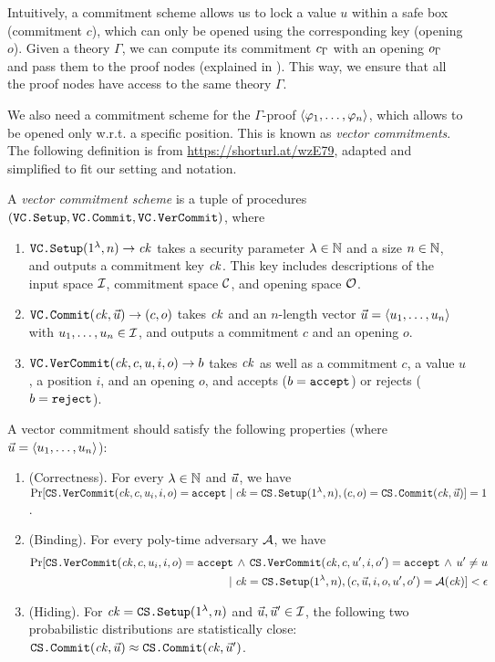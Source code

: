 \documentclass{article}
\begin{document}
Intuitively, a commitment scheme allows us to lock a value $u$
within a safe box (commitment $c$),
which can only be opened using the corresponding key (opening $o$).
Given a theory $\Gamma$, we can compute its commitment $c_\Gamma$
with an opening $o_\Gamma$ and pass them to the proof nodes
(explained in ).
This way, we ensure that all the proof nodes have access to the same
theory $\Gamma$.

We also need a commitment scheme for the $\Gamma$-proof $\left\langle \varphi_1,\dots,\varphi_n \right\rangle$,
which allows to be opened only w.r.t. a specific position.
This is known as \emph{vector commitments}.
The following definition is from \url{https://shorturl.at/wzE79},
adapted and simplified
to fit our setting and notation.
\begin{definition}
A \emph{vector commitment scheme} is a tuple of procedures
$(\textnormal{\texttt{VC.Setup}}, \textnormal{\texttt{VC.Commit}}, \textnormal{\texttt{VC.VerCommit}})$, where
\begin{enumerate}
\item $\textnormal{\texttt{VC.Setup}}(1^\lambda, n) \to \mathit{ck}$
      takes a security parameter $\lambda \in \mathbb{N}$
      and a size $n \in \mathbb{N}$,
      and outputs a commitment key $\mathit{ck}$. This key includes descriptions of
      the input space
      $\mathcal{I}$,  commitment space $\mathcal{C}$, and opening space $\mathcal{O}$.
\item $\textnormal{\texttt{VC.Commit}}(\mathit{ck}, \vec{u}) \to  (c, o)$ takes $\mathit{ck}$ and
      an $n$-length vector $\vec{u} = \left\langle u_1,\dots,u_n \right\rangle$ with $u_1,\dots,u_n \in \mathcal{I}$,
      and outputs a commitment $c$ and an opening $o$.
\item $\textnormal{\texttt{VC.VerCommit}}(\mathit{ck}, c, u, i, o) \to b$ takes $\mathit{ck}$ as well as
      a commitment $c$, a value $u$, a position $i$, and an opening $o$,
      and accepts ($b = \textnormal{\texttt{accept}}$) or rejects ($b = \textnormal{\texttt{reject}}$).
\end{enumerate}
A vector commitment should satisfy the following properties
(where $\vec{u} = \left\langle u_1,\dots,u_n \right\rangle$):
\begin{enumerate}
\item (Correctness).
      For every $\lambda \in \mathbb{N}$ and $\vec{u}$, we have
      $\Pr[\textnormal{\texttt{CS.VerCommit}}(\mathit{ck}, c, u_i, i, o) = \textnormal{\texttt{accept}} \mid \mathit{ck} = \textnormal{\texttt{CS.Setup}}(1^\lambda, n), (c,o) = \textnormal{\texttt{CS.Commit}}(\mathit{ck}, \vec{u})] = 1$.
\item (Binding).
      For every poly-time adversary $\mathcal{A}$, we have
      \begin{align*}
           \Pr[\textnormal{\texttt{CS.VerCommit}}(\mathit{ck}, c, u_i, i, o) = \textnormal{\texttt{accept}} \,\land\,
           \textnormal{\texttt{CS.VerCommit}}(\mathit{ck}, c, u', i, o') = \textnormal{\texttt{accept}} \,\land\, u' \neq u
           \\ \mid
           \mathit{ck} = \textnormal{\texttt{CS.Setup}}(1^\lambda, n), (c,\vec{u},i, o,u',o') = \mathcal{A}(\mathit{ck})] < \epsilon
      \end{align*}
\item (Hiding). For $\mathit{ck} = \textnormal{\texttt{CS.Setup}}(1^\lambda, n)$ and $\vec{u},\vec{u}' \in \mathcal{I}$,
      the following two probabilistic distributions are statistically close:
      $\textnormal{\texttt{CS.Commit}}(\mathit{ck}, \vec{u}) \approx \textnormal{\texttt{CS.Commit}}(\mathit{ck}, \vec{u}')$.
\end{enumerate}
\end{definition}
\end{document}
